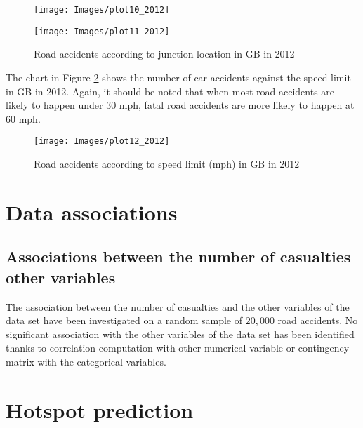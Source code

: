 \documentclass{article}
\begin{document}
 \begin{figure}[!h]
 
\hspace{-1cm}
\begin{minipage}[b]{.46\linewidth}
  \centering
    \texttt{[image: Images/plot10\_2012]}
\end{minipage}
\hspace{1cm}
\begin{minipage}[b]{0.46\linewidth}
  \centering
     \texttt{[image: Images/plot11\_2012]}
\end{minipage}
\caption{Road accidents according to junction location in GB in 2012 }  
 \label{fig:plot10_2012}
 \end{figure}
 
The chart in Figure \ref{fig:plot12_2012} shows the number of car accidents against the speed limit in GB in 2012. Again, it should be noted that when most road accidents are likely to happen under 30 mph, fatal road accidents are more likely to happen at 60 mph.
 
 \begin{figure}[H]
 \vspace{-0.5cm}
  \centering
  \texttt{[image: Images/plot12\_2012]}
  \caption{Road accidents according to speed limit (mph) in GB in 2012 }
  \label{fig:plot12_2012}
\end{figure} 

 
 
\section{Data associations}

\subsection{Associations between the number of casualties other variables}
The association between the number of casualties and the other variables of the data set have been investigated on a random sample of $20,000$ road accidents.
No significant association with the other variables of the data set has been identified thanks to correlation computation with other numerical variable or contingency matrix with the categorical variables.





\section{Hotspot prediction}
\end{document}
